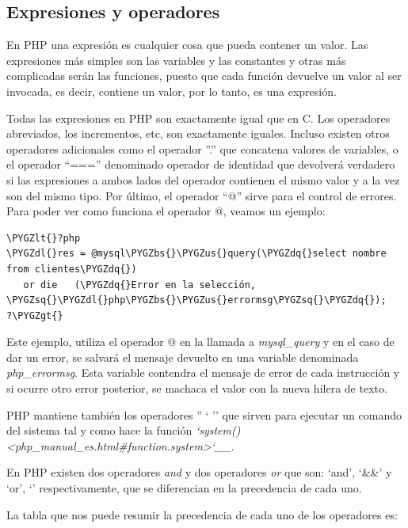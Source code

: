 \documentclass[a5paper,10pt,spanish]{sphinxmanual}
\def\PYGZbs{\char`\\}
\def\PYGZus{\char`\_}
\def\PYGZlt{\char`\<}
\def\PYGZgt{\char`\>}
\def\PYGZdl{\char`\$}
\def\PYGZsq{\char`\'}
\def\PYGZdq{\char`\"}
\begin{document}
\subsection{Expresiones y operadores}
\label{Tutorial1_Conceptos.md:expresiones-y-operadores}
En PHP una expresión es cualquier cosa que pueda contener un valor. Las
expresiones más simples son las variables y las constantes y otras más
complicadas serán las funciones, puesto que cada función devuelve un
valor al ser invocada, es decir, contiene un valor, por lo tanto, es una
expresión.

Todas las expresiones en PHP son exactamente igual que en C. Los
operadores abreviados, los incrementos, etc, son exactamente iguales.
Incluso existen otros operadores adicionales como el operador ''.'' que
concatena valores de variables, o el operador ``==='' denominado operador
de identidad que devolverá verdadero si las expresiones a ambos lados
del operador contienen el mismo valor y a la vez son del mismo tipo. Por
último, el operador ``@'' sirve para el control de errores. Para poder ver
como funciona el operador @, veamos un ejemplo:

\begin{Verbatim}[commandchars=\\\{\}]
\PYGZlt{}?php
\PYGZdl{}res = @mysql\PYGZbs{}\PYGZus{}query(\PYGZdq{}select nombre from clientes\PYGZdq{})
   or die   (\PYGZdq{}Error en la selección, \PYGZsq{}\PYGZdl{}php\PYGZbs{}\PYGZus{}errormsg\PYGZsq{}\PYGZdq{});
?\PYGZgt{}
\end{Verbatim}

Este ejemplo, utiliza el operador @ en la llamada a \emph{mysql\_query} y en
el caso de dar un error, se salvará el mensaje devuelto en una variable
denominada \emph{php\_errormsg}. Esta variable contendra el mensaje de error
de cada instrucción y si ocurre otro error posterior, se machaca el
valor con la nueva hilera de texto.

PHP mantiene también los operadores '' ` '' que sirven para ejecutar un
comando del sistema tal y como hace la función
\emph{{}`system() \textless{}php\_manual\_es.html\#function.system\textgreater{}{}`\_\_}.

En PHP existen dos operadores \emph{and} y dos operadores \emph{or} que son:
`and', `\&\&' y `or', `\textbar{}\textbar{}' respectivamente, que se diferencian en la
precedencia de cada uno.

La tabla que nos puede resumir la precedencia de cada uno de los
operadores es:
\end{document}
